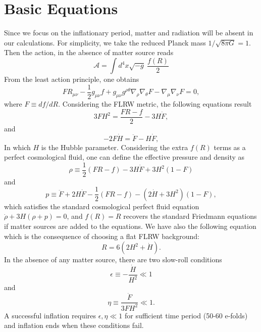 \documentclass[a4paper,11pt]{article}
\begin{document}
\section{Basic Equations}
Since we focus on the inflationary period, matter and radiation will be absent in our calculations. For simplicity, we take the reduced Planck mass $1/\sqrt{8\pi G}=1$. Then the action, in the absence of matter source reads \cite{imgg,mgwn,fel,for,cfp}
\begin{equation}
\mathcal{A}=\int d^4 x \sqrt{-g}\:\frac{f(R)}{2}
\end{equation}
From the least action principle, one obtains
\begin{equation}
F R_{\mu\nu}-\frac{1}{2}g_{\mu\nu}f+g_{\mu\nu}g^{\rho\theta}\nabla_\rho\nabla_\theta F-\nabla_\mu \nabla_\nu F=0,
\end{equation}
where $F\equiv df/dR$. Considering the FLRW metric, the following equations result \cite{eos} 
\begin{equation}
3 F H^2=\frac{FR-f}{2}-3H\dot{F},
\label{E1}
\end{equation}
and
\begin{equation}
-2 F \dot{H}=\ddot{F}-H\dot{F},
\label{E2}
\end{equation}
In which $H$ is the Hubble parameter.
Considering the extra $f(R)$ terms as a perfect cosmological fluid, one can define the effective pressure and density as 
\begin{equation}
\rho\equiv \frac{1}{2}(F R-f)-3 H \dot{F}+3 H^2(1-F)
\end{equation}
and
\begin{equation}
p\equiv \ddot{F}+2H\dot{F}-\frac{1}{2}(F R-f)-(2 \dot{H}+3 H^2)(1-F),
\end{equation}
which satisfies the standard cosmological perfect fluid equation $\dot{\rho}+3H(\rho+p)=0$, and $f(R)=R$ recovers the standard Friedmann equations if matter sources are added to the equations. We have also the following equation which is the consequence of choosing a flat FLRW background:
\begin{equation}
R=6(2 H^2+\dot{H}).
\label{flrw}
\end{equation}
In the absence of any matter source, there are two slow-roll conditions \cite{imgg,fel,for}
\begin{equation}
\epsilon\equiv -\frac{\dot{H}}{H^2}\ll 1
\label{eps}
\end{equation}
and
\begin{equation}
\eta\equiv \frac{\dot{F}}{3 F H^2}\ll 1.
\label{eta}
\end{equation}
A successful inflation requires $\epsilon,\eta\ll1$ for sufficient time period (50-60 e-folds) and inflation ends when these conditions fail. 
\end{document}
